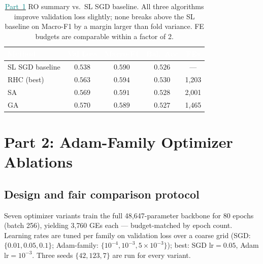 \documentclass[conference]{IEEEtran}
\newcommand{\partref}[2]{\hyperref[#2]{\textcolor{teal}{Part~#1}}}
\begin{document}
\begin{table}[t]\centering
\caption{\partref{1}{sec:p1} RO summary vs.\ SL SGD baseline.
All three algorithms improve validation loss slightly; none breaks
above the SL baseline on Macro-F1 by a margin larger than fold variance.
FE budgets are comparable within a factor of 2.}
\label{tab:ro_summary}
\centering\small
{}
\begin{tabularx}{\linewidth}{Xcccc}
\toprule
\rowcolor{denimdark}
\textcolor{white}{\textbf{Method}} &
\textcolor{white}{\textbf{Val Loss}} & \textcolor{white}{\textbf{Macro-F1}} & \textcolor{white}{\textbf{Bal.\ Acc}} & \textcolor{white}{\textbf{FEs}} \\
\midrule
SL SGD baseline & $0.538$ & $0.590$ & $0.526$ & --- \\
RHC (best) & $0.563$ & $0.594$ & $0.530$ & 1{,}203 \\
SA          & $0.569$ & $0.591$ & $0.528$ & 2{,}001 \\
GA          & $0.570$ & $0.589$ & $0.527$ & 1{,}465 \\
\bottomrule
\end{tabularx}
\end{table}

\section{Part 2: Adam-Family Optimizer Ablations}\label{sec:p2}

\subsection{Design and fair comparison protocol}\label{sec:p2:design}
Seven optimizer variants train the full 48{,}647-parameter backbone for 80
epochs (batch 256), yielding 3{,}760 GEs each --- budget-matched by
epoch count.
Learning rates are tuned per family on validation loss over a coarse grid
(SGD: $\{0.01, 0.05, 0.1\}$; Adam-family: $\{10^{-4}, 10^{-3}, 5\times10^{-3}\}$);
best: SGD lr$=0.05$, Adam lr$=10^{-3}$.
Three seeds $\{42, 123, 7\}$ are run for every variant.
\end{document}
